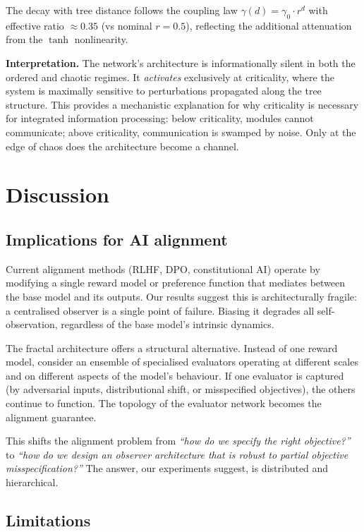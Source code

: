 \documentclass[11pt,a4paper]{article}
\begin{document}
The decay with tree distance follows the coupling law
$\gamma(d) = \gamma_0 \cdot r^d$ with effective ratio $\approx 0.35$
(vs nominal $r = 0.5$), reflecting the additional attenuation from the
$\tanh$ nonlinearity.

\textbf{Interpretation.} The network's architecture is informationally
silent in both the ordered and chaotic regimes. It \emph{activates}
exclusively at criticality, where the system is maximally sensitive to
perturbations propagated along the tree structure. This provides a
mechanistic explanation for why criticality is necessary for integrated
information processing: below criticality, modules cannot communicate;
above criticality, communication is swamped by noise. Only at the edge
of chaos does the architecture become a channel.

\section{Discussion}

\subsection{Implications for AI alignment}

Current alignment methods (RLHF, DPO, constitutional AI) operate by
modifying a single reward model or preference function that mediates
between the base model and its outputs. Our results suggest this is
architecturally fragile: a centralised observer is a single point of
failure. Biasing it degrades all self-observation, regardless of the
base model's intrinsic dynamics.

The fractal architecture offers a structural alternative. Instead of one
reward model, consider an ensemble of specialised evaluators operating at
different scales and on different aspects of the model's behaviour. If
one evaluator is captured (by adversarial inputs, distributional shift,
or misspecified objectives), the others continue to function. The
topology of the evaluator network becomes the alignment guarantee.

This shifts the alignment problem from \emph{``how do we specify the
right objective?''} to \emph{``how do we design an observer architecture
that is robust to partial objective misspecification?''} The answer, our
experiments suggest, is distributed and hierarchical.

\subsection{Limitations}
\end{document}
